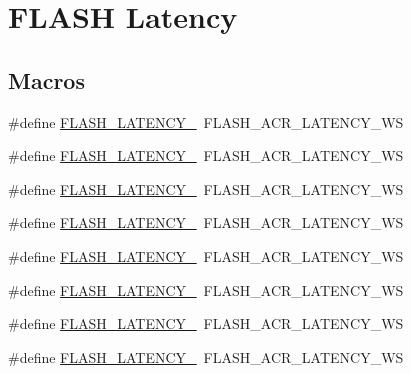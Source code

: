 \hypertarget{group___f_l_a_s_h___latency}{}\section{F\+L\+A\+SH Latency}
\label{group___f_l_a_s_h___latency}
\subsection*{Macros}
\begin{DoxyCompactItemize}
\item 
\#define \mbox{\hyperlink{group___f_l_a_s_h___latency_ga1276f51e97dc9857ca261fae4eb890f3}{F\+L\+A\+S\+H\+\_\+\+L\+A\+T\+E\+N\+C\+Y\+\_}}~F\+L\+A\+S\+H\+\_\+\+A\+C\+R\+\_\+\+L\+A\+T\+E\+N\+C\+Y\+\_\+WS
\item 
\#define \mbox{\hyperlink{group___f_l_a_s_h___latency_ga28c611f2cb4a3772ab37c538357fd5f6}{F\+L\+A\+S\+H\+\_\+\+L\+A\+T\+E\+N\+C\+Y\+\_}}~F\+L\+A\+S\+H\+\_\+\+A\+C\+R\+\_\+\+L\+A\+T\+E\+N\+C\+Y\+\_\+WS
\item 
\#define \mbox{\hyperlink{group___f_l_a_s_h___latency_ga69d209f9cb4f625010d72555c8dceb03}{F\+L\+A\+S\+H\+\_\+\+L\+A\+T\+E\+N\+C\+Y\+\_}}~F\+L\+A\+S\+H\+\_\+\+A\+C\+R\+\_\+\+L\+A\+T\+E\+N\+C\+Y\+\_\+WS
\item 
\#define \mbox{\hyperlink{group___f_l_a_s_h___latency_ga2f607c9fa7bdcd53df0e98a7b1e67496}{F\+L\+A\+S\+H\+\_\+\+L\+A\+T\+E\+N\+C\+Y\+\_}}~F\+L\+A\+S\+H\+\_\+\+A\+C\+R\+\_\+\+L\+A\+T\+E\+N\+C\+Y\+\_\+WS
\item 
\#define \mbox{\hyperlink{group___f_l_a_s_h___latency_ga65fe32d2c25a3d5ee3dce89dee459fa5}{F\+L\+A\+S\+H\+\_\+\+L\+A\+T\+E\+N\+C\+Y\+\_}}~F\+L\+A\+S\+H\+\_\+\+A\+C\+R\+\_\+\+L\+A\+T\+E\+N\+C\+Y\+\_\+WS
\item 
\#define \mbox{\hyperlink{group___f_l_a_s_h___latency_ga2517d62fa71e27b3b53223bbaacd06f7}{F\+L\+A\+S\+H\+\_\+\+L\+A\+T\+E\+N\+C\+Y\+\_}}~F\+L\+A\+S\+H\+\_\+\+A\+C\+R\+\_\+\+L\+A\+T\+E\+N\+C\+Y\+\_\+WS
\item 
\#define \mbox{\hyperlink{group___f_l_a_s_h___latency_gad047485b4941997af3c55ad61ad9c13a}{F\+L\+A\+S\+H\+\_\+\+L\+A\+T\+E\+N\+C\+Y\+\_}}~F\+L\+A\+S\+H\+\_\+\+A\+C\+R\+\_\+\+L\+A\+T\+E\+N\+C\+Y\+\_\+WS
\item 
\#define \mbox{\hyperlink{group___f_l_a_s_h___latency_ga09e9f01dd2e6e361adc9c995a5a73510}{F\+L\+A\+S\+H\+\_\+\+L\+A\+T\+E\+N\+C\+Y\+\_}}~F\+L\+A\+S\+H\+\_\+\+A\+C\+R\+\_\+\+L\+A\+T\+E\+N\+C\+Y\+\_\+WS
\item 

\end{DoxyCompactItemize}
